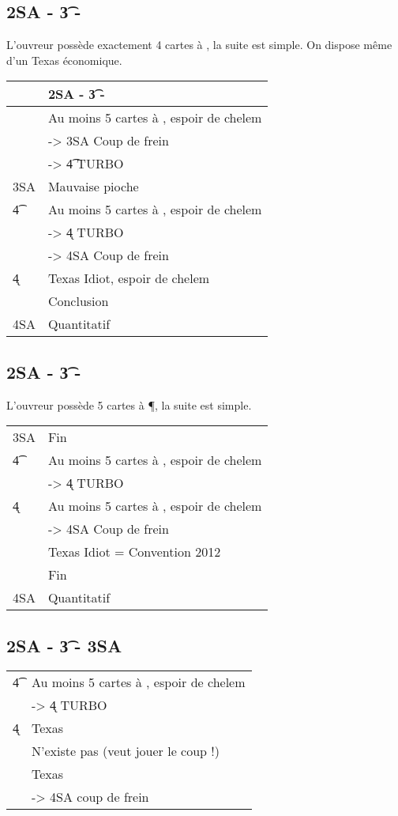 \documentclass[a4paper,12pt]{article}
\begin{document}
\subsection*{2SA - \t3 - }
L'ouvreur possède exactement 4 cartes à \C, la suite est simple. On dispose même d'un Texas \T économique.

\begin{tabular}{|l|l|}
\hline
& {2SA - \t3 - \co3}\\
\hline
 \p3 & Au moins 5 cartes à \T, espoir de chelem\\
  & -> 3SA Coup de frein\\
   & -> \t4 TURBO\\
 3SA & Mauvaise pioche\\
 \t4 & Au moins 5 cartes à \K, espoir de chelem\\
 & -> \k4 TURBO\\
 & -> 4SA Coup de frein\\
 \k4 & Texas Idiot, espoir de chelem\\
 \co4 & Conclusion\\
 4SA & Quantitatif \\
 \hline
\end{tabular}

\subsection*{2SA - \t3 - }

L'ouvreur possède 5 cartes à \P, la suite est simple.

\begin{tabular}{ll}
 3SA & Fin\\
  \t4 & Au moins 5 cartes à \K, espoir de chelem\\
 & -> \k4 TURBO\\
 \k4 & Au moins 5 cartes à \T, espoir de chelem\\
 & -> 4SA Coup de frein\\
 \co4 & Texas Idiot = Convention 2012\\
 \p4 & Fin\\
 4SA & Quantitatif\\
\end{tabular}


\subsection*{2SA - \t3 - 3SA}



\begin{tabular}{ll}
  \t4 & Au moins 5 cartes à \K, espoir de chelem\\
 & -> \k4 TURBO\\
 \k4 & Texas \C \\
 \co4 & N'existe pas (veut jouer le coup !)\\
 \p4 & Texas \T\\
 & -> 4SA coup de frein\\
 
\end{tabular}
\end{document}
